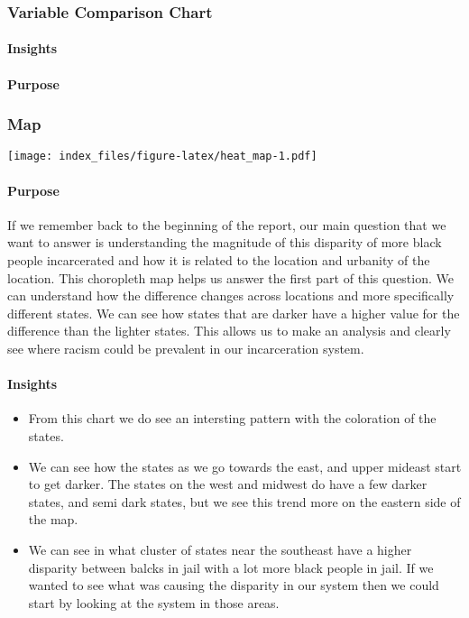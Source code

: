 \documentclass[
]{article}
\begin{document}
\hypertarget{variable-comparison-chart}{%
\subsubsection{Variable Comparison
Chart}\label{variable-comparison-chart}}

\hypertarget{insights-1}{%
\paragraph{Insights}\label{insights-1}}

\hypertarget{purpose-1}{%
\paragraph{Purpose}\label{purpose-1}}

\hypertarget{map}{%
\subsubsection{Map}\label{map}}

\texttt{[image: index\_files/figure-latex/heat\_map-1.pdf]}

\hypertarget{purpose-2}{%
\paragraph{Purpose}\label{purpose-2}}

If we remember back to the beginning of the report, our main question
that we want to answer is understanding the magnitude of this disparity
of more black people incarcerated and how it is related to the location
and urbanity of the location. This choropleth map helps us answer the
first part of this question. We can understand how the difference
changes across locations and more specifically different states. We can
see how states that are darker have a higher value for the difference
than the lighter states. This allows us to make an analysis and clearly
see where racism could be prevalent in our incarceration system.

\hypertarget{insights-2}{%
\paragraph{Insights}\label{insights-2}}

\begin{itemize}
\item
  From this chart we do see an intersting pattern with the coloration of
  the states.
\item
  We can see how the states as we go towards the east, and upper mideast
  start to get darker. The states on the west and midwest do have a few
  darker states, and semi dark states, but we see this trend more on the
  eastern side of the map.
\item
  We can see in what cluster of states near the southeast have a higher
  disparity between balcks in jail with a lot more black people in jail.
  If we wanted to see what was causing the disparity in our system then
  we could start by looking at the system in those areas.
\end{itemize}
\end{document}
